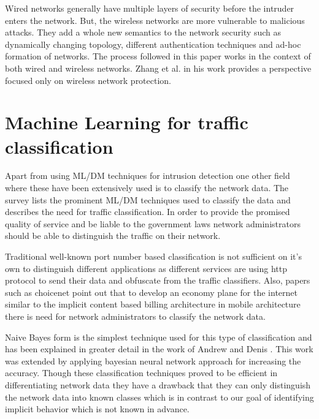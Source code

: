 Wired networks generally have multiple layers of security before the intruder enters the network. But, the wireless networks are more vulnerable to malicious attacks. They add a whole new semantics to the network security such as dynamically changing topology, different authentication techniques and ad-hoc formation of networks. The process  followed in this paper works in the context of both wired and wireless networks. Zhang et al. in his work \cite{zhang2003intrusion} provides a perspective focused only on wireless network protection.

\section{Machine Learning for traffic classification}

Apart from using ML/DM techniques for intrusion detection one other field where these have been extensively used is to classify the network data. The survey \cite{nguyen2008survey} lists the prominent ML/DM techniques used to classify the data and describes the need for traffic classification. In order to provide the promised quality of service and be liable to the government laws network administrators should be able to distinguish the traffic on their network. 

Traditional well-known port number based classification is not sufficient on it's own to distinguish different applications  as different services are using http protocol to send their data and obfuscate from the traffic classifiers. Also, papers such as choicenet \cite{wolf2014choicenet} point out that to develop an economy plane for the internet similar to the implicit content based billing architecture in mobile architecture there is need for network administrators to classify the network data.

Naive Bayes form is the simplest technique used for this type of classification and has been explained in greater detail in the work of Andrew and Denis \cite{moore2005internet}. This work was extended by applying bayesian neural network approach \cite{auld2007bayesian} for increasing the accuracy. Though these classification techniques proved to be efficient in differentiating network data they have a drawback that they can only distinguish the network data into known classes which is in contrast to our goal of identifying implicit behavior which is not known in advance.


